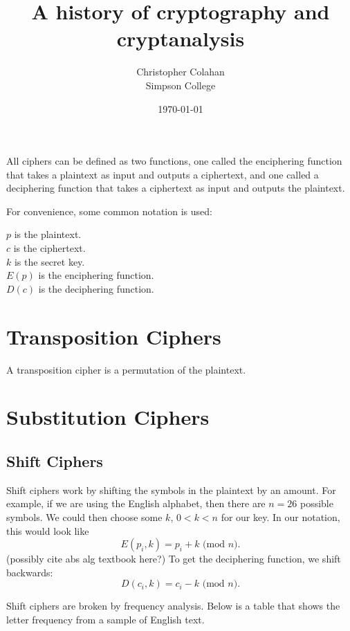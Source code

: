 \documentclass[12pt]{article}
\title{A history of cryptography and cryptanalysis}
\date{\today}
\author{Christopher Colahan\\ Simpson College}
\begin{document}
\maketitle
\newpage

\tableofcontents
\newpage

All ciphers can be defined as two functions, one called the enciphering function that takes a plaintext as input and outputs a ciphertext, and one called a deciphering function that takes a ciphertext as input and outputs the plaintext.

For convenience, some common notation is used:

{\centering
	$p$ is the plaintext.\\
	$c$ is the ciphertext.\\
	$k$ is the secret key.\\
	$E(p)$ is the enciphering function.\\
	$D(c)$ is the deciphering function.\\
}


\section{Transposition Ciphers}
A transposition cipher is a permutation of the plaintext.

\section{Substitution Ciphers}

\subsection{Shift Ciphers}
Shift ciphers work by shifting the symbols in the plaintext by an amount. For example, if we are using the English alphabet, then there are $n=26$ possible symbols. We could then choose some $k$, $0<k<n$ for our key. In our notation, this would look like
$$E(p_i,k)=p_i+k\text{ (mod $n$)}.$$ (possibly cite abs alg textbook here?)
To get the deciphering function, we shift backwards:
$$D(c_i,k)=c_i-k\text{ (mod $n$)}.$$


Shift ciphers are broken by frequency analysis. Below is a table that shows the letter frequency from a sample of English text.
\end{document}
